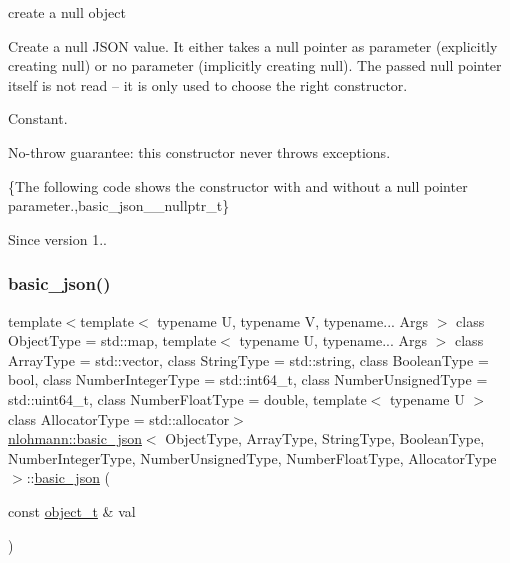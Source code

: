 create a null object 

Create a {\ttfamily null} J\+S\+ON value. It either takes a null pointer as parameter (explicitly creating {\ttfamily null}) or no parameter (implicitly creating {\ttfamily null}). The passed null pointer itself is not read -- it is only used to choose the right constructor.

Constant.

No-\/throw guarantee\+: this constructor never throws exceptions.

\{The following code shows the constructor with and without a null pointer parameter.,basic\+\_\+json\+\_\+\+\_\+nullptr\+\_\+t\}

\begin{DoxySince}{Since}
version 1.. 
\end{DoxySince}
\hypertarget{classnlohmann_1_1basic__json_a9af5ea68c88f423ddf35216aff7f1813}{}\label{classnlohmann_1_1basic__json_a9af5ea68c88f423ddf35216aff7f1813} 
\subsubsection{\texorpdfstring{basic\+\_\+json()}{basic\_json()}\hspace{0.1cm}{\footnotesize\ttfamily [3/23]}}
{\footnotesize\ttfamily template$<$template$<$ typename U, typename V, typename... Args $>$ class Object\+Type = std\+::map, template$<$ typename U, typename... Args $>$ class Array\+Type = std\+::vector, class String\+Type  = std\+::string, class Boolean\+Type  = bool, class Number\+Integer\+Type  = std\+::int64\+\_\+t, class Number\+Unsigned\+Type  = std\+::uint64\+\_\+t, class Number\+Float\+Type  = double, template$<$ typename U $>$ class Allocator\+Type = std\+::allocator$>$ \\
\hyperlink{classnlohmann_1_1basic__json}{nlohmann\+::basic\+\_\+json}$<$ Object\+Type, Array\+Type, String\+Type, Boolean\+Type, Number\+Integer\+Type, Number\+Unsigned\+Type, Number\+Float\+Type, Allocator\+Type $>$\+::\hyperlink{classnlohmann_1_1basic__json}{basic\+\_\+json} (\begin{DoxyParamCaption}\item[{const \hyperlink{classnlohmann_1_1basic__json_a0ac9894c9de8dc551cf2e5f1c605537f}{object\+\_\+t} \&}]{val }\end{DoxyParamCaption})\hspace{0.3cm}{\ttfamily [inline]}}



